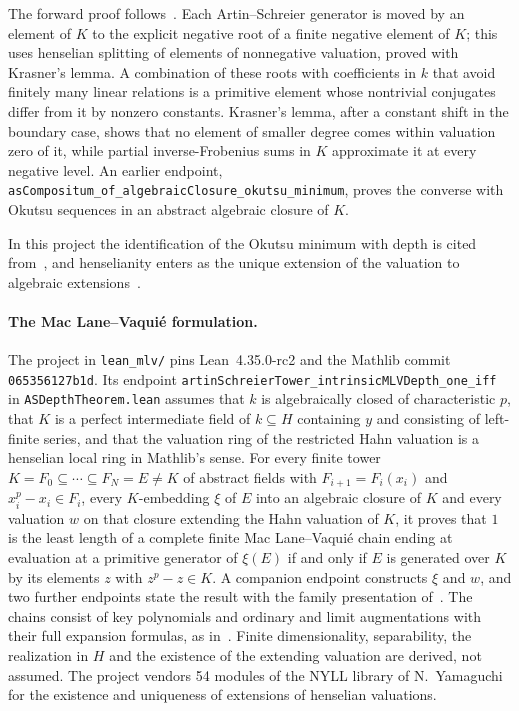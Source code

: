 \documentclass[11pt]{article}
\newcommand{\code}[1]{\nolinkurl{#1}}
\begin{document}
The forward proof follows~\cite{NN}. Each Artin--Schreier generator is moved by an element of $K$ to the explicit negative root of a finite negative element of $K$; this uses henselian splitting of elements of nonnegative valuation, proved with Krasner's lemma. A combination of these roots with coefficients in $k$ that avoid finitely many linear relations is a primitive element whose nontrivial conjugates differ from it by nonzero constants. Krasner's lemma, after a constant shift in the boundary case, shows that no element of smaller degree comes within valuation zero of it, while partial inverse-Frobenius sums in $K$ approximate it at every negative level. An earlier endpoint, \code{asCompositum_of_algebraicClosure_okutsu_minimum}, proves the converse with Okutsu sequences in an abstract algebraic closure of $K$.

In this project the identification of the Okutsu minimum with depth is cited from~\cite[Theorem~1.3]{NN}, and henselianity enters as the unique extension of the valuation to algebraic extensions~\cite[\S4.1]{EP}.

\paragraph{The Mac Lane--Vaquié formulation.} The project in \code{lean\_mlv/} pins Lean~4.35.0-rc2 and the Mathlib commit \code{065356127b1d}. Its endpoint \code{artinSchreierTower_intrinsicMLVDepth_one_iff} in \code{ASDepthTheorem.lean} assumes that $k$ is algebraically closed of characteristic $p$, that $K$ is a perfect intermediate field of $k\subseteq H$ containing $y$ and consisting of left-finite series, and that the valuation ring of the restricted Hahn valuation is a henselian local ring in Mathlib's sense. For every finite tower $K=F_0\subseteq\cdots\subseteq F_N=E\ne K$ of abstract fields with $F_{i+1}=F_i(x_i)$ and $x_i^p-x_i\in F_i$, every $K$-embedding $\xi$ of $E$ into an algebraic closure of $K$ and every valuation $w$ on that closure extending the Hahn valuation of $K$, it proves that $1$ is the least length of a complete finite Mac Lane--Vaquié chain ending at evaluation at a primitive generator of $\xi(E)$ if and only if $E$ is generated over $K$ by its elements $z$ with $z^p-z\in K$. A companion endpoint constructs $\xi$ and $w$, and two further endpoints state the result with the family presentation of~\cite[Definitions~1.9--1.11]{N24}. The chains consist of key polynomials and ordinary and limit augmentations with their full expansion formulas, as in~\cite{N21}. Finite dimensionality, separability, the realization in $H$ and the existence of the extending valuation are derived, not assumed. The project vendors 54 modules of the NYLL library of N.~Yamaguchi for the existence and uniqueness of extensions of henselian valuations.
\end{document}
